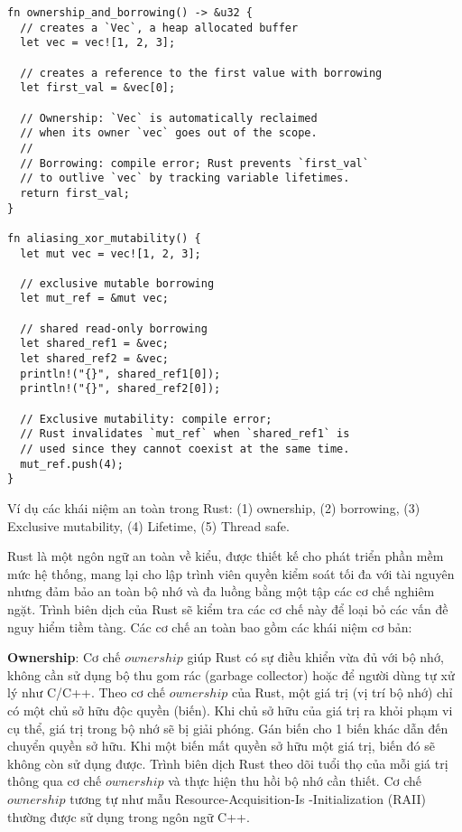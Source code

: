 \begin{listing}[H]
\begin{verbatim}
fn ownership_and_borrowing() -> &u32 {
  // creates a `Vec`, a heap allocated buffer
  let vec = vec![1, 2, 3];

  // creates a reference to the first value with borrowing
  let first_val = &vec[0];

  // Ownership: `Vec` is automatically reclaimed
  // when its owner `vec` goes out of the scope.
  //
  // Borrowing: compile error; Rust prevents `first_val`
  // to outlive `vec` by tracking variable lifetimes.
  return first_val;
}

fn aliasing_xor_mutability() {
  let mut vec = vec![1, 2, 3];

  // exclusive mutable borrowing
  let mut_ref = &mut vec;

  // shared read-only borrowing
  let shared_ref1 = &vec;
  let shared_ref2 = &vec;
  println!("{}", shared_ref1[0]);
  println!("{}", shared_ref2[0]);

  // Exclusive mutability: compile error;
  // Rust invalidates `mut_ref` when `shared_ref1` is
  // used since they cannot coexist at the same time.
  mut_ref.push(4);
}
\end{verbatim}
\caption{Ví dụ các khái niệm an toàn trong Rust: (1) ownership, (2) borrowing, (3) Exclusive mutability, (4) Lifetime, (5) Thread safe.}
\label{code:c2_safe_rust}
\end{listing}
Rust là một ngôn ngữ an toàn về kiểu,
được thiết kế cho phát triển phần mềm mức hệ thống,
mang lại cho lập trình viên quyền kiểm soát tối đa với tài nguyên nhưng đảm bảo an toàn bộ nhớ và đa luồng bằng một tập các cơ chế nghiêm ngặt.
Trình biên dịch của Rust sẽ kiểm tra các cơ chế này để loại bỏ các vấn đề nguy hiểm tiềm tàng.
Các cơ chế an toàn bao gồm các khái niệm cơ bản:

\textbf{Ownership}: Cơ chế $ownership$ giúp Rust có sự điều khiển vừa đủ với bộ nhớ, không cần sử dụng bộ thu gom rác (garbage collector) hoặc để người dùng tự xử lý như C/C++.
Theo cơ chế $ownership$ của Rust, một giá trị (vị trí bộ nhớ) chỉ có một chủ sở hữu độc quyền (biến).
Khi chủ sở hữu của giá trị ra khỏi phạm vi cụ thể, giá trị trong bộ nhớ sẽ bị giải phóng.
Gán biến cho 1 biến khác dẫn đến chuyển quyền sở hữu.
Khi một biến mất quyền sở hữu một giá trị, biến đó sẽ không còn sử dụng được.
Trình biên dịch Rust theo dõi tuổi thọ của mỗi giá trị thông qua cơ chế $ownership$ và thực hiện thu hồi bộ nhớ cần thiết.
Cơ chế $ownership$ tương tự như mẫu Resource-Acquisition-Is -Initialization (RAII) \cite{cppreferenceRAIICppreferencecom} thường được sử dụng trong ngôn ngữ C++.

